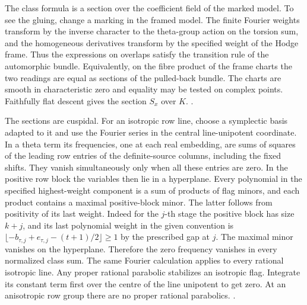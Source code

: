 The class formula is a section over the coefficient
field of the marked model. To see the gluing, change
a marking in the framed model. The finite Fourier
weights transform by the inverse character to the
theta-group action on the torsion sum, and the
homogeneous derivatives transform by the specified
weight of the Hodge frame. Thus the expressions
on overlaps satisfy the transition rule of the
automorphic bundle. Equivalently, on the fibre product
of the frame charts the two readings are equal as
sections of the pulled-back bundle. The charts are
smooth in characteristic zero and equality may be
tested on complex points. Faithfully flat descent
gives the section \(S_x\) over \(K\).
.

The sections are cuspidal. For an isotropic row line,
choose a symplectic basis adapted to it and use the
Fourier series in the central line-unipotent coordinate.
In a theta term its frequencies, one at each real
embedding, are sums of squares of the leading row
entries of the definite-source columns, including the
fixed shifts. They vanish simultaneously only when
all these entries are zero. In the positive row
block the variables then lie in a hyperplane. Every
polynomial in the specified highest-weight component
is a sum of products of flag minors, and each product
contains a maximal positive-block minor. The latter
follows from positivity of its last weight. Indeed
for the \(j\)-th stage the positive block has size
\(k+j\), and its last polynomial weight in the
given convention is
\(\lfloor-b_{\tau,j}+e_{\tau,j}-(t+1)/2\rfloor\ge1\)
by the prescribed gap at \(j\). The maximal minor
vanishes on the hyperplane. Therefore the zero
frequency vanishes in every normalized class sum.
The same Fourier calculation applies to every
rational isotropic line. Any proper rational
parabolic stabilizes an isotropic flag. Integrate its
constant term first over the centre of the line
unipotent to get zero. At an anisotropic row group
there are no proper rational parabolics.
.

